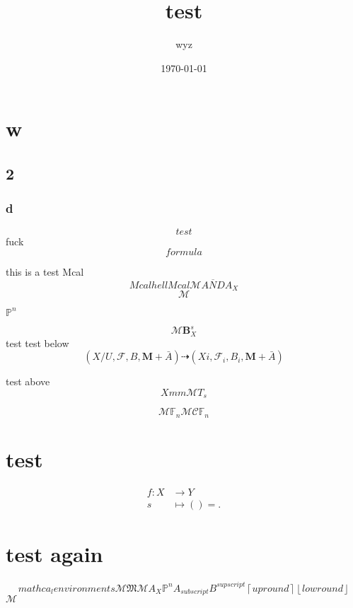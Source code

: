 \documentclass{article}
\title{test}
\author{wyz}
\date{\today}
\begin{document}
\maketitle
\section{w}
\subsection{2}

\subsubsection{d}
\begin{equation}
  test 
\end{equation}
fuck
\[
	formula
\]

\newpage

this is a test
Mcal
\begin{equation}
	Mcal hell Mcal
	\mathcal{M}  \overline{AND} A_{X}
\end{equation}
\[
	\mathcal{M}
\]

$\mathbb{P}^{n}$

\[
	\mathcal{M} \mathbf{B}_{X}^{s}
\]
test
test below
\[
	(X/U,\mathcal{F},B,\mathbf{M}+ \bar{A})  \dashrightarrow (Xi,\mathcal{F}_{i},B_{i},\mathbf{M}+\bar{A})
\]

test above
\[
	Xmm  \mathcal{M} T_{s}
\]

\[
	\mathcal{M} \mathbb{F}_{n}
  \mathcal{M} \mathcal{C} \mathbb{F}_{n}
\]

\section{test}
\begin{center}
	\begin{align*}
		f : X & \longrightarrow Y \\
		s     & \longmapsto () =
		.\end{align*}
\end{center}

\section{test again}
\[
  mathca_{l} environments  \mathcal{M} \mathfrak{M} \mathscr{M} A_{X} \mathbb{P}^{n} A_{subscript} B^{supscript} \left\lceil up round \right\rceil \left\lfloor low round \right\rfloor 
\] $\mathcal{M}$
\end{document}
